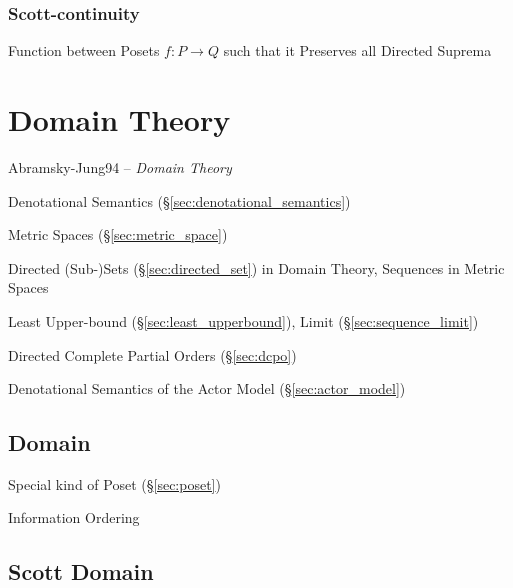 \subsubsection{Scott-continuity}\label{sec:scott_continuity}

Function between Posets $f : P \rightarrow Q$ such that it Preserves
all Directed Suprema %



\section{Domain Theory}\label{sec:domain_theory}


Abramsky-Jung94 -- \emph{Domain Theory}

Denotational Semantics (\S\ref{sec:denotational_semantics})

Metric Spaces (\S\ref{sec:metric_space})

Directed (Sub-)Sets (\S\ref{sec:directed_set}) in Domain Theory,
Sequences in Metric Spaces

Least Upper-bound (\S\ref{sec:least_upperbound}), Limit
(\S\ref{sec:sequence_limit})

Directed Complete Partial Orders (\S\ref{sec:dcpo})

Denotational Semantics of the Actor Model (\S\ref{sec:actor_model})



\subsection{Domain}\label{sec:order_domain}

Special kind of Poset (\S\ref{sec:poset})

Information Ordering



\subsection{Scott Domain}\label{sec:scott_domain}

